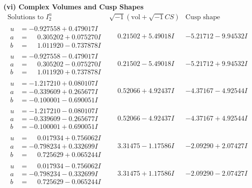\documentclass[1p]{elsarticle_modified}
\theoremstyle{definition}
\newcommand{\I}{\sqrt{-1}}
\begin{document}
\newpage\flushleft \textbf{(vi) Complex Volumes and Cusp Shapes}
$$\begin{array}{c|c|c}  
\text{Solutions to }I^u_{2}& \I (\text{vol} + \sqrt{-1}CS) & \text{Cusp shape}\\
 \hline 
\begin{aligned}
u &= -0.927558 + 0.479017 I \\
a &= \phantom{-}0.305202 + 0.075270 I \\
b &= \phantom{-}1.011920 - 0.737878 I\end{aligned}
 & \phantom{-}0.21502 + 5.49018 I & -5.21712 - 9.94532 I \\ \hline\begin{aligned}
u &= -0.927558 - 0.479017 I \\
a &= \phantom{-}0.305202 - 0.075270 I \\
b &= \phantom{-}1.011920 + 0.737878 I\end{aligned}
 & \phantom{-}0.21502 - 5.49018 I & -5.21712 + 9.94532 I \\ \hline\begin{aligned}
u &= -1.217210 + 0.080107 I \\
a &= -0.339609 + 0.265677 I \\
b &= -0.100001 - 0.690051 I\end{aligned}
 & \phantom{-}0.52066 + 4.92437 I & -4.37167 - 4.92544 I \\ \hline\begin{aligned}
u &= -1.217210 - 0.080107 I \\
a &= -0.339609 - 0.265677 I \\
b &= -0.100001 + 0.690051 I\end{aligned}
 & \phantom{-}0.52066 - 4.92437 I & -4.37167 + 4.92544 I \\ \hline\begin{aligned}
u &= \phantom{-}0.017934 + 0.756062 I \\
a &= -0.798234 + 0.332699 I \\
b &= \phantom{-}0.725629 + 0.065244 I\end{aligned}
 & \phantom{-}3.31475 - 1.17586 I & -2.09290 + 2.07427 I \\ \hline\begin{aligned}
u &= \phantom{-}0.017934 - 0.756062 I \\
a &= -0.798234 - 0.332699 I \\
b &= \phantom{-}0.725629 - 0.065244 I\end{aligned}
 & \phantom{-}3.31475 + 1.17586 I & -2.09290 - 2.07427 I \\ \hline\begin{aligned}

\end{aligned}
\end{array}$$
\end{document}
